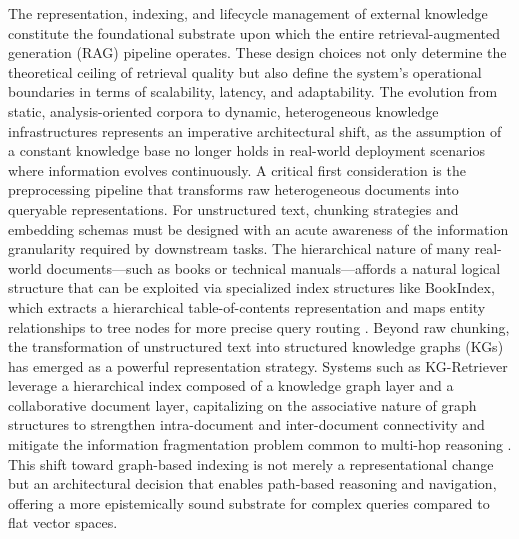 \documentclass[11pt,a4paper]{article}
\begin{document}
The representation, indexing, and lifecycle management of external knowledge constitute the foundational substrate upon which the entire retrieval-augmented generation (RAG) pipeline operates. These design choices not only determine the theoretical ceiling of retrieval quality but also define the system's operational boundaries in terms of scalability, latency, and adaptability. The evolution from static, analysis-oriented corpora to dynamic, heterogeneous knowledge infrastructures represents an imperative architectural shift, as the assumption of a constant knowledge base no longer holds in real-world deployment scenarios where information evolves continuously. A critical first consideration is the preprocessing pipeline that transforms raw heterogeneous documents into queryable representations. For unstructured text, chunking strategies and embedding schemas must be designed with an acute awareness of the information granularity required by downstream tasks. The hierarchical nature of many real-world documents---such as books or technical manuals---affords a natural logical structure that can be exploited via specialized index structures like BookIndex, which extracts a hierarchical table-of-contents representation and maps entity relationships to tree nodes for more precise query routing \cite{arxiv:2512.03413v1}. Beyond raw chunking, the transformation of unstructured text into structured knowledge graphs (KGs) has emerged as a powerful representation strategy. Systems such as KG-Retriever leverage a hierarchical index composed of a knowledge graph layer and a collaborative document layer, capitalizing on the associative nature of graph structures to strengthen intra-document and inter-document connectivity and mitigate the information fragmentation problem common to multi-hop reasoning \cite{arxiv:2412.05547v2}. This shift toward graph-based indexing is not merely a representational change but an architectural decision that enables path-based reasoning and navigation, offering a more epistemically sound substrate for complex queries compared to flat vector spaces.
\end{document}
